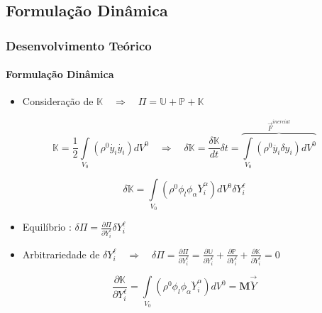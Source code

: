 \documentclass{beamer}
\begin{document}
\subsection{Formulação Dinâmica}
\begin{frame}
    \frametitle{Desenvolvimento Teórico}
    \framesubtitle{Formulação Dinâmica}

    \begin{itemize}
        \item Consideração de \(\mathbb{K} \quad \Rightarrow \quad \varPi = \mathbb{U} + \mathbb{P} + \mathbb{K}\)
    \end{itemize}

    \begin{equation}
        \mathbb{K} = \frac{1}{2} \int\limits_{V_0} \left(\rho^0 \dot{y_i} \dot{y_i} \right) dV^0
        \quad \Rightarrow \quad
        \delta \mathbb{K} = \frac{\delta \mathbb{K}}{dt}\delta t = \overbrace{\int\limits_{V_0} \left(\rho^0 \ddot{y_i} \delta y_i \right) dV^0}^{\vec{F}^{inercial}}
    \end{equation}

    \begin{equation}
        \delta \mathbb{K} = \int\limits_{V_0} \left(\rho^0 \phi_l \phi_\alpha \ddot{Y}_i^\alpha \right) dV^0 \delta Y_i^\ell
    \end{equation}

    \begin{itemize}
        \item Equilíbrio : \(\delta \varPi = \frac{\partial \varPi}{\partial Y_i^\ell}\delta Y_i^\ell \)
        \item Arbitrariedade de \(\delta Y_i^\ell \quad \Rightarrow \quad \delta \varPi = \frac{\partial \varPi}{\partial Y_i^\ell} = \frac{\partial \mathbb{U}}{\partial Y_i^\ell} + \frac{\partial \mathbb{P}}{\partial Y_i^\ell}  + \frac{\partial \mathbb{K}}{\partial Y_i^\ell} = 0 \)
    \end{itemize}

    \begin{equation}
        \frac{\partial \mathbb{K}}{\partial Y_i^\ell} = \int\limits_{V_0} \left(\rho^0 \phi_l \phi_\alpha \ddot{Y}_i^\alpha \right) dV^0 
        =
        \mathbf{M} \vec{\ddot{Y}} 
    \end{equation}

\end{frame}
\end{document}
